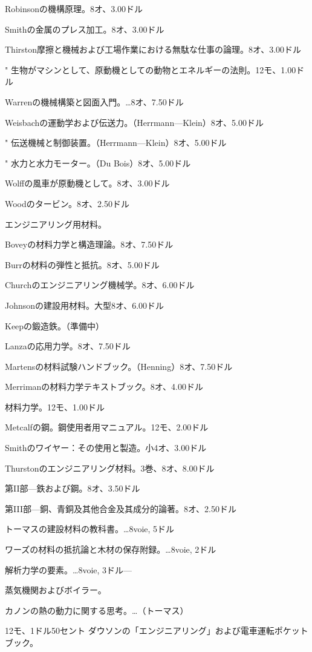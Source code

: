 \documentclass[a4paper,11pt,openany]{ltjsbook}
\begin{document}
Robinsonの機構原理。8オ、3.00ドル

Smithの金属のプレス加工。8オ、3.00ドル

Thirston摩擦と機械および工場作業における無駄な仕事の論理。8オ、3.00ドル

"          生物がマシンとして、原動機としての動物とエネルギーの法則。12モ、1.00ドル

Warrenの機械構築と図面入門。…8オ、7.50ドル

Weisbachの運動学および伝送力。（Herrmann—Klein）8オ、5.00ドル

"          伝送機械と制御装置。（Herrmann—Klein）8オ、5.00ドル

"          水力と水力モーター。（Du Bois）8オ、5.00ドル

Wolffの風車が原動機として。8オ、3.00ドル

Woodのタービン。8オ、2.50ドル

エンジニアリング用材料。

Boveyの材料力学と構造理論。8オ、7.50ドル

Burrの材料の弾性と抵抗。8オ、5.00ドル

Churchのエンジニアリング機械学。8オ、6.00ドル

Johnsonの建設用材料。大型8オ、6.00ドル

Keepの鍛造鉄。（準備中）

Lanzaの応用力学。8オ、7.50ドル

Martensの材料試験ハンドブック。（Henning）8オ、7.50ドル

Merrimanの材料力学テキストブック。8オ、4.00ドル

材料力学。12モ、1.00ドル

Metcalfの鋼。鋼使用者用マニュアル。12モ、2.00ドル

Smithのワイヤー：その使用と製造。小4オ、3.00ドル

Thurstonのエンジニアリング材料。3巻、8オ、8.00ドル

第II部—鉄および鋼。8オ、3.50ドル

第III部—銅、青銅及其他合金及其成分的論著。8オ、2.50ドル

トーマスの建設材料の教科書。…8voie, 5ドル

ワーズの材料の抵抗論と木材の保存附録。…8voie, 2ドル

解析力学の要素。…8voie, 3ドル—

蒸気機関およびボイラー。

カノンの熱の動力に関する思考。…（トーマス）

12モ、1ドル50セント ダウソンの「エンジニアリング」および電車運転ポケットブック。
\end{document}
